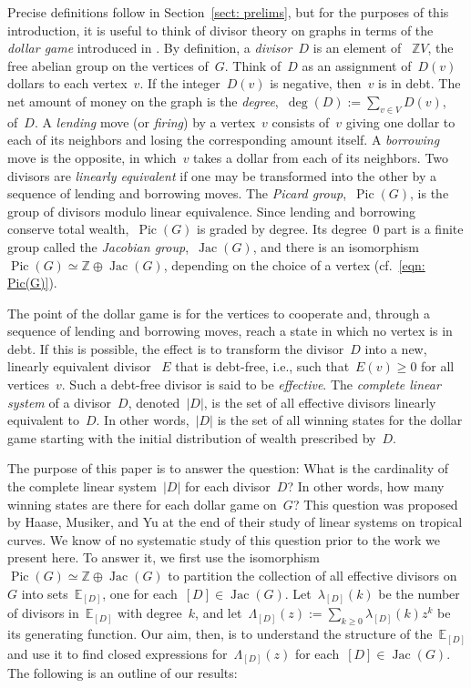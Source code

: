 \documentclass{amsart}
\DeclareMathOperator{\Pic}{Pic}
\DeclareMathOperator{\Jac}{Jac}
\newcommand{\Z}{\mathbb{Z}}
\newcommand{\E}{\mathbb{E}}
\begin{document}
Precise definitions follow in Section~\ref{sect: prelims}, but for the purposes
of this introduction, it is useful to think of divisor theory on graphs in terms
of the {\em dollar game} introduced in \cite{Baker}.  By definition, a {\em
divisor}~$D$ is an element of ~$\Z V$, the free abelian group on the vertices
of~$G$.  Think of~$D$ as an assignment of~$D(v)$ dollars to each vertex~$v$.  If
the integer~$D(v)$ is negative, then~$v$ is in debt.  The net amount of money on
the graph is the {\em degree},~$\deg(D):=\sum_{v\in V}D(v)$, of~$D$.  A {\em
lending} move (or {\em firing}) by a vertex~$v$ consists of~$v$ giving one
dollar to each of its neighbors and losing the corresponding amount itself.  A
{\em borrowing} move is the opposite, in which~$v$ takes a dollar from each of
its neighbors.  Two divisors are {\em linearly equivalent} if one may be
transformed into the other by a sequence of lending and borrowing moves.  The
{\em Picard group},~$\Pic(G)$, is the group of divisors modulo linear
equivalence.  Since lending and borrowing conserve total wealth,~$\Pic(G)$
is graded by degree.  Its degree~$0$ part is a finite group called the {\em
Jacobian group},~$\Jac(G)$, and there is an
isomorphism~$\Pic(G)\simeq\Z\oplus\Jac(G)$, depending on the choice of a vertex
(cf.~\eqref{eqn: Pic(G)}).

The point of the dollar game is for the vertices to cooperate and, through a
sequence of lending and borrowing moves, reach a state in which no vertex is in
debt.  If this is possible, the effect is to transform the divisor~$D$ into a
new, linearly equivalent divisor ~$E$ that is debt-free, i.e.,  such
that~$E(v)\geq 0$ for all vertices~$v$.  Such a debt-free divisor is said to be
{\em effective}.  The {\em complete linear system} of a divisor~$D$,
denoted~$|D|$, is the set of all effective divisors linearly equivalent to~$D$.
In other words,~$|D|$ is the set of all winning states for the dollar game
starting with the initial distribution of wealth prescribed by~$D$.

The purpose of this paper is to answer the question: What is the cardinality of
the complete linear system~$|D|$ for each divisor~$D$?  In other words, how
many winning states are there for each dollar game on~$G$? 
This question was proposed by Haase, Musiker, and Yu at the end of their study
\cite{Haase} of linear systems on tropical curves. 
We know of no systematic study of this question prior to the work we present
here.  
To answer it, we first use the
isomorphism~$\Pic(G)\simeq\Z\oplus\Jac(G)$ to partition the collection of all
effective divisors on~$G$ into sets~$\E_{[D]}$, one for each~$[D]\in\Jac(G)$.
Let~$\lambda_{[D]}(k)$ be the number of divisors in~$\E_{[D]}$ with degree~$k$,
and let~$\Lambda_{[D]}(z):=\sum_{k\geq0}\lambda_{[D]}(k)z^k$ be its generating
function.  Our aim, then, is to understand the structure of the~$\E_{[D]}$ and
use it to find closed expressions for~$\Lambda_{[D]}(z)$ for
each~$[D]\in\Jac(G)$. The following is an outline of our results:
\smallskip
\end{document}
